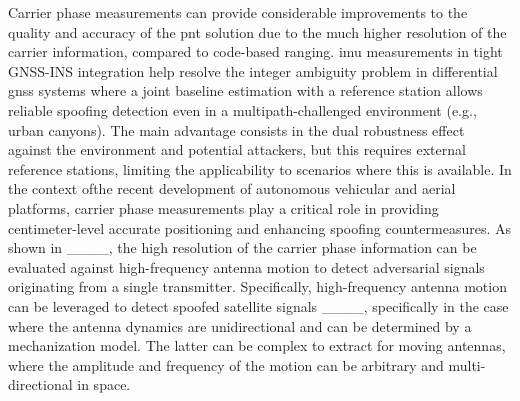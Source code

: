Carrier phase measurements can provide considerable improvements to the quality and accuracy of the \gls{pnt} solution due to the much higher resolution of the carrier information, compared to code-based ranging. \gls{imu} measurements in tight GNSS-INS integration help resolve the integer ambiguity problem in differential \gls{gnss} systems where a joint baseline estimation with a reference station allows reliable spoofing detection even in a multipath-challenged environment (e.g., urban canyons). The main advantage consists in the dual robustness effect against the environment and potential attackers, but this requires external reference stations, limiting the applicability to scenarios where this is available. In the context ofthe  recent development of autonomous vehicular and aerial platforms, carrier phase measurements play a critical role in providing centimeter-level accurate positioning and enhancing spoofing countermeasures. As shown in ____, the high resolution of the carrier phase information can be evaluated against high-frequency antenna motion to detect adversarial signals originating from a single transmitter. 
Specifically, high-frequency antenna motion can be leveraged to detect spoofed satellite signals ____, specifically in the case where the antenna dynamics are unidirectional and can be determined by a mechanization model. The latter can be complex to extract for moving antennas, where the amplitude and frequency of the motion can be arbitrary and multi-directional in space.